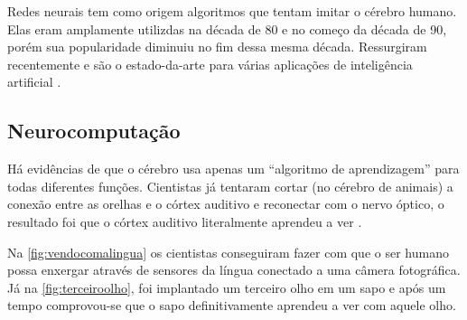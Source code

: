 Redes neurais tem como origem algoritmos que tentam imitar o cérebro humano. Elas eram amplamente utilizdas na década de 80 e no começo da década de 90, porém sua popularidade diminuiu no fim dessa mesma década. Ressurgiram recentemente e são o estado-da-arte para várias aplicações de inteligência artificial \cite{machinelearningcoursera}.

\subsection{Neurocomputação}

Há evidências de que o cérebro usa apenas um ``algoritmo de aprendizagem'' para todas diferentes funções. Cientistas já tentaram cortar (no cérebro de animais) a conexão entre as orelhas e o córtex auditivo e reconectar com o nervo óptico, o resultado foi que o córtex auditivo literalmente aprendeu a ver \cite{machinelearningcoursera}. 

Na \autoref{fig:vendocomalingua} os cientistas conseguiram fazer com que o ser humano possa enxergar através de sensores da língua conectado a uma câmera fotográfica. Já na \autoref{fig:terceiroolho}, foi implantado um terceiro olho em um sapo e após um tempo comprovou-se que o sapo definitivamente aprendeu a ver com aquele olho.


